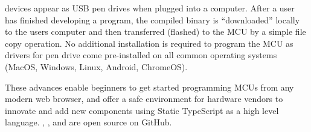 \MC devices appear as USB pen drives when plugged into a computer. After a user has finished developing a program, the compiled binary is ``downloaded'' locally to the users computer and then transferred (flashed) to the MCU by a simple file copy operation. No additional installation is required to program the MCU as drivers for pen drive come pre-installed on all common operating systems (MacOS, Windows, Linux, Android, ChromeOS).

These advances enable beginners to get started programming MCUs from any modern web browser, and offer a safe environment for hardware vendors to innovate and add new components using Static TypeScript as a high level language. \emph{\href{https://github.com/microsoft/pxt}{\MCN}}, \emph{\href{https://github.com/lancaster-university/codal}{\CON}}, and \emph{\href{https://github.com/microsoft/UF2}{\UFN}} are open source on GitHub.